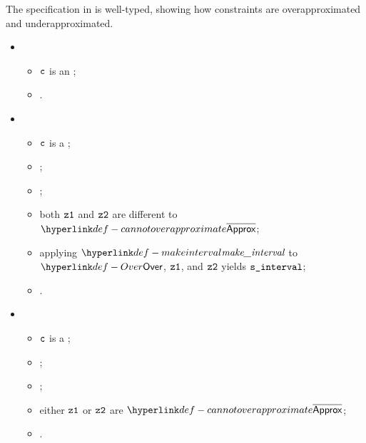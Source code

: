 The specification in  is well-typed,
showing how constraints are overapproximated and underapproximated.

\ProseParagraph
\OneApplies
\begin{itemize}
  \item {}
  \begin{itemize}
    \item $\texttt{c}$ is an \Proseexactconstraint{\ve};
    \item \Proseapproxexpr{$\tenv$}{$\vapprox$}{$\ve$}{$\vs$}\ProseTerminateAs{\CannotOverapproximate}.
  \end{itemize}

  \item {}
  \begin{itemize}
    \item $\texttt{c}$ is a \Proserangeconstraint{\veone}{\vetwo};
    \item \Proseapproxexprmin{$\tenv$}{$\veone$}{$\vzone$};
    \item \Proseapproxexprmax{$\tenv$}{$\vetwo$}{$\vztwo$};
    \item both $\vzone$ and $\vztwo$ are different to $\CannotOverapproximate$;
    \item applying $\makeinterval$ to $\Over$, $\vzone$, and $\vztwo$ yields $\texttt{s\_interval}$;
    \item {}.
  \end{itemize}

    \item {}
  \begin{itemize}
    \item $\texttt{c}$ is a \Proserangeconstraint{\veone}{\vetwo};
    \item \Proseapproxexprmin{$\tenv$}{$\veone$}{$\vzone$};
    \item \Proseapproxexprmax{$\tenv$}{$\vetwo$}{$\vztwo$};
    \item either $\vzone$ or $\vztwo$ are $\CannotOverapproximate$;
    \item {}.
  \end{itemize}


\end{itemize}
